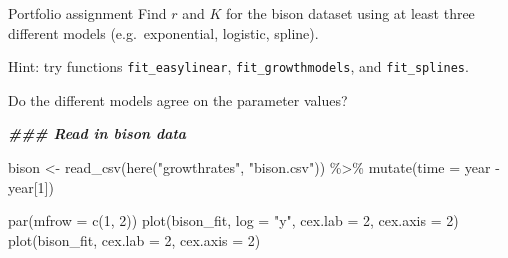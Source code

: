 \documentclass[
  ignorenonframetext,
]{beamer}
\newenvironment{Shaded}{\begin{snugshade}}{\end{snugshade}}
\newcommand{\AttributeTok}[1]{\textcolor[rgb]{0.77,0.63,0.00}{#1}}
\newcommand{\CommentTok}[1]{\textcolor[rgb]{0.56,0.35,0.01}{\textit{#1}}}
\newcommand{\DecValTok}[1]{\textcolor[rgb]{0.00,0.00,0.81}{#1}}
\newcommand{\DocumentationTok}[1]{\textcolor[rgb]{0.56,0.35,0.01}{\textbf{\textit{#1}}}}
\newcommand{\FunctionTok}[1]{\textcolor[rgb]{0.00,0.00,0.00}{#1}}
\newcommand{\NormalTok}[1]{#1}
\newcommand{\OtherTok}[1]{\textcolor[rgb]{0.56,0.35,0.01}{#1}}
\newcommand{\SpecialCharTok}[1]{\textcolor[rgb]{0.00,0.00,0.00}{#1}}
\newcommand{\StringTok}[1]{\textcolor[rgb]{0.31,0.60,0.02}{#1}}
\begin{document}
\begin{frame}[fragile]{Portfolio assignment}
\protect\hypertarget{portfolio-assignment}{}
Find \(r\) and \(K\) for the bison dataset using at least three
different models (e.g.~exponential, logistic, spline).

Hint: try functions \texttt{fit\_easylinear},
\texttt{fit\_growthmodels}, and \texttt{fit\_splines}.

Do the different models agree on the parameter values?

\begin{Shaded}
\begin{Highlighting}[]
\DocumentationTok{\#\#\# Read in bison data}

\NormalTok{bison }\OtherTok{\textless{}{-}} \FunctionTok{read\_csv}\NormalTok{(}\FunctionTok{here}\NormalTok{(}\StringTok{"growthrates"}\NormalTok{, }\StringTok{"bison.csv"}\NormalTok{)) }\SpecialCharTok{\%\textgreater{}\%} 
  \FunctionTok{mutate}\NormalTok{(}\AttributeTok{time =}\NormalTok{ year }\SpecialCharTok{{-}}\NormalTok{ year[}\DecValTok{1}\NormalTok{])}
\end{Highlighting}
\end{Shaded}

\begin{Shaded}
\end{Shaded}

\begin{Shaded}
\begin{Highlighting}[]
\FunctionTok{par}\NormalTok{(}\AttributeTok{mfrow =} \FunctionTok{c}\NormalTok{(}\DecValTok{1}\NormalTok{, }\DecValTok{2}\NormalTok{))}
\FunctionTok{plot}\NormalTok{(bison\_fit, }\AttributeTok{log =} \StringTok{"y"}\NormalTok{, }\AttributeTok{cex.lab =} \DecValTok{2}\NormalTok{, }\AttributeTok{cex.axis =} \DecValTok{2}\NormalTok{)}
\FunctionTok{plot}\NormalTok{(bison\_fit, }\AttributeTok{cex.lab =} \DecValTok{2}\NormalTok{, }\AttributeTok{cex.axis =} \DecValTok{2}\NormalTok{)}
\end{Highlighting}
\end{Shaded}


\end{frame}
\end{document}
